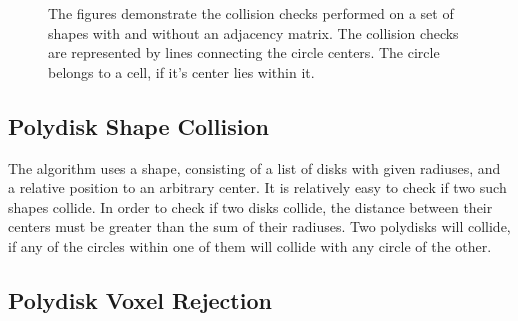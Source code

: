 \documentclass[12pt, oneside]{report}
\begin{document}
\begin{figure}[H]
\caption{The figures demonstrate the collision checks performed on a set of shapes with and without an adjacency matrix. The collision checks are represented by lines connecting the circle centers. The circle belongs to a cell, if it's center lies within it.}
\end{figure}

\subsection{Polydisk Shape Collision}

The algorithm uses a shape, consisting of a list of disks with given radiuses, and a relative position to an arbitrary center. It is relatively easy to check if two such shapes collide. In order to check if two disks collide, the distance between their centers must be greater than the sum of their radiuses. Two polydisks will collide, if any of the circles within one of them will collide with any circle of the other.\newline

\subsection{Polydisk Voxel Rejection}
\end{document}
